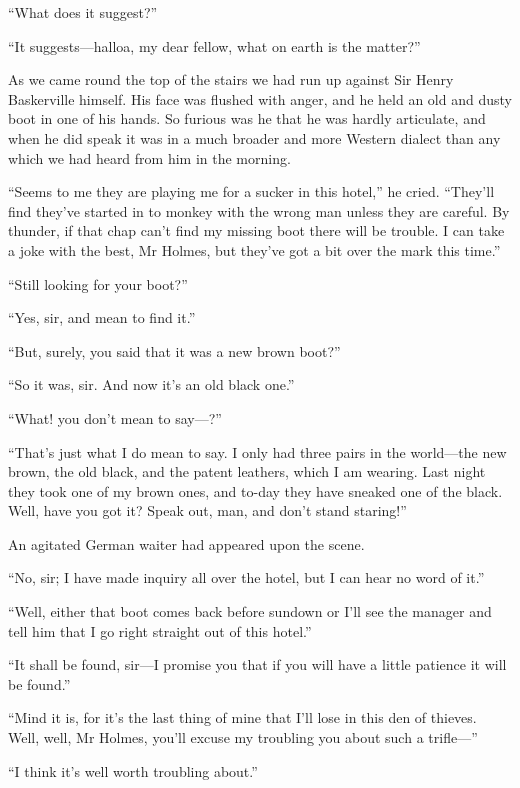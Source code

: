 \documentclass[paper=a5,BCOR=7mm,twoside,DIV=calc,12pt,usegeometry,openany,chapterprefix,endperiod,headings=big]{scrbook} %
\begin{document}
\enquote{What does it suggest?}

\enquote{It suggests---halloa, my dear fellow, what on earth is the matter?}

As we came round the top of the stairs we had run up against Sir Henry Baskerville himself. His face was flushed with anger, and he held an old and dusty boot in one of his hands. So furious was he that he was hardly articulate, and when he did speak it was in a much broader and more Western dialect than any which we had heard from him in the morning.

\enquote{Seems to me they are playing me for a sucker in this hotel,} he cried. \enquote{They'll find they've started in to monkey with the wrong man unless they are careful. By thunder, if that chap can't find my missing boot there will be trouble. I can take a joke with the best, Mr Holmes, but they've got a bit over the mark this time.}

\enquote{Still looking for your boot?}

\enquote{Yes, sir, and mean to find it.}

\enquote{But, surely, you said that it was a new brown boot?}

\enquote{So it was, sir. And now it's an old black one.}

\enquote{What! you don't mean to say---?}

\enquote{That's just what I do mean to say. I only had three pairs in the world---the new brown, the old black, and the patent leathers, which I am wearing. Last night they took one of my brown ones, and to-day they have sneaked one of the black. Well, have you got it? Speak out, man, and don't stand staring!}

An agitated German waiter had appeared upon the scene.

\enquote{No, sir; I have made inquiry all over the hotel, but I can hear no word of it.}

\enquote{Well, either that boot comes back before sundown or I'll see the manager and tell him that I go right straight out of this hotel.}

\enquote{It shall be found, sir---I promise you that if you will have a little patience it will be found.}

\enquote{Mind it is, for it's the last thing of mine that I'll lose in this den of thieves. Well, well, Mr Holmes, you'll excuse my troubling you about such a trifle---}

\enquote{I think it's well worth troubling about.}
\end{document}
